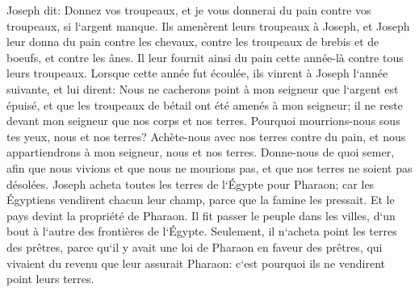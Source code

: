 \verse Joseph dit: Donnez vos troupeaux, et je vous donnerai du pain contre vos troupeaux, si l`argent manque. 
\verse Ils amenèrent leurs troupeaux à Joseph, et Joseph leur donna du pain contre les chevaux, contre les troupeaux de brebis et de boeufs, et contre les ânes. Il leur fournit ainsi du pain cette année-là contre tous leurs troupeaux. 
\verse Lorsque cette année fut écoulée, ils vinrent à Joseph l`année suivante, et lui dirent: Nous ne cacherons point à mon seigneur que l`argent est épuisé, et que les troupeaux de bétail ont été amenés à mon seigneur; il ne reste devant mon seigneur que nos corps et nos terres. 
\verse Pourquoi mourrions-nous sous tes yeux, nous et nos terres? Achète-nous avec nos terres contre du pain, et nous appartiendrons à mon seigneur, nous et nos terres. Donne-nous de quoi semer, afin que nous vivions et que nous ne mourions pas, et que nos terres ne soient pas désolées. 
\verse Joseph acheta toutes les terres de l`Égypte pour Pharaon; car les Égyptiens vendirent chacun leur champ, parce que la famine les pressait. Et le pays devint la propriété de Pharaon. 
\verse Il fit passer le peuple dans les villes, d`un bout à l`autre des frontières de l`Égypte. 
\verse Seulement, il n`acheta point les terres des prêtres, parce qu`il y avait une loi de Pharaon en faveur des prêtres, qui vivaient du revenu que leur assurait Pharaon: c`est pourquoi ils ne vendirent point leurs terres. 
